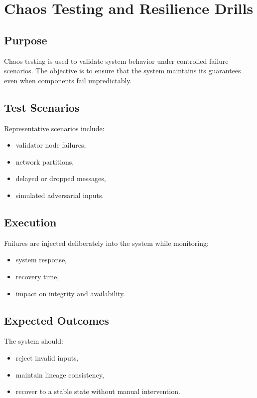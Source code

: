 \section{Chaos Testing and Resilience Drills}

\subsection{Purpose}

Chaos testing is used to validate system behavior under controlled failure scenarios. The objective is to ensure that the system maintains its guarantees even when components fail unpredictably.

\subsection{Test Scenarios}

Representative scenarios include:
\begin{itemize}
\item validator node failures,
\item network partitions,
\item delayed or dropped messages,
\item simulated adversarial inputs.
\end{itemize}

\subsection{Execution}

Failures are injected deliberately into the system while monitoring:
\begin{itemize}
\item system response,
\item recovery time,
\item impact on integrity and availability.
\end{itemize}

\subsection{Expected Outcomes}

The system should:
\begin{itemize}
\item reject invalid inputs,
\item maintain lineage consistency,
\item recover to a stable state without manual intervention.
\end{itemize}

